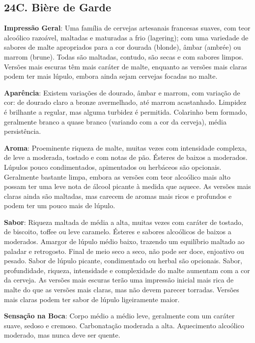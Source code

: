 \subsection*{24C. Bière de Garde}

\textbf{Impressão Geral}: Uma família de cervejas artesanais francesas suaves, com teor alcoólico razoável, maltadas e maturadas a frio (lagering); com uma variedade de sabores de malte apropriados para a cor dourada (blonde), âmbar (ambrée) ou marrom (brune). Todas são maltadas, contudo, são secas e com sabores limpos. Versões mais escuras têm mais caráter de malte, enquanto as versões mais claras podem ter mais lúpulo, embora ainda sejam cervejas focadas no malte.

\textbf{Aparência}: Existem variações de dourado, âmbar e marrom, com variação de cor: de dourado claro a bronze avermelhado, até marrom acastanhado. Limpidez é brilhante a regular, mas alguma turbidez é permitida. Colarinho bem formado, geralmente branco a quase branco (variando com a cor da cerveja), média persistência.

\textbf{Aroma}: Proeminente riqueza de malte, muitas vezes com intensidade complexa, de leve a moderada, tostado e com notas de pão. Ésteres de baixos a moderados. Lúpulos pouco condimentados, apimentados ou herbáceos são opcionais. Geralmente bastante limpa, embora as versões com teor alcoólico mais alto possam ter uma leve nota de álcool picante à medida que aquece. As versões mais claras ainda são maltadas, mas carecem de aromas mais ricos e profundos e podem ter um pouco mais de lúpulo.

\textbf{Sabor}: Riqueza maltada de média a alta, muitas vezes com caráter de tostado, de biscoito, toffee ou leve caramelo. Ésteres e sabores alcoólicos de baixos a moderados. Amargor de lúpulo médio baixo, trazendo um equilíbrio maltado ao paladar e retrogosto. Final de meio seco a seco, não pode ser doce, enjoativo ou pesado. Sabor de lúpulo picante, condimentado ou herbal são opcionais. Sabor, profundidade, riqueza, intensidade e complexidade do malte aumentam com a cor da cerveja. As versões mais escuras terão uma impressão inicial mais rica de malte do que as versões mais claras, mas não devem parecer torradas. Versões mais claras podem ter sabor de lúpulo ligeiramente maior.

\textbf{Sensação na Boca}: Corpo médio a médio leve, geralmente com um caráter suave, sedoso e cremoso. Carbonatação moderada a alta. Aquecimento alcoólico moderado, mas nunca deve ser quente.

